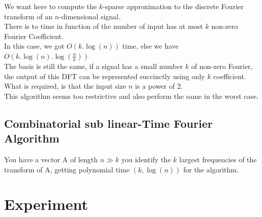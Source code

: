 \documentclass{article}
\begin{document}
We want here to compute the $k$-sparse approximation to the discrete Fourier transform of an $n$-dimensional signal.\\
There is to time in function of the number of input has at most $k$ non-zero Fourier Coefficient.\\
In this case, we got $O(k.\log(n))$ time, else we have $O(k.\log(n).\log(\frac{n}{k}))$\\
The basis is still the same, if a signal has a small number $k$ of non-zero Fourier, the output of this DFT can be represented succinctly using only $k$ coefficient.\\
What is required, is that the input size $n$ is a power of 2.\\
This algorithm seems too restrictive and also perform the same in the worst case.\\

\subsection{Combinatorial sub linear-Time Fourier Algorithm}

You have a vector A of length $n \gg k$ you identify the $k$ largest frequencies of the transform of A, getting polynomial time $(k,\log(n))$ for the algorithm.\\

\section{Experiment}
\end{document}
